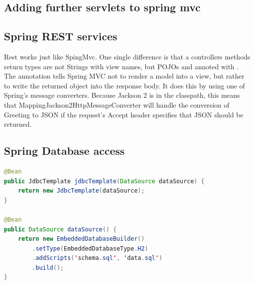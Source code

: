 \subsection{Adding further servlets to spring mvc}




\subsection{Spring REST services}
Rest works just like SpingMvc. One single difference is that a controllers methods return types are not Strings with view names, but POJOs and annoted with . The  annotation tells Spring MVC not to render a model into a view, but rather to write the returned object into the response body. It does this by using one of Spring’s message converters. Because Jackson 2 is in the classpath, this means that MappingJackson2HttpMessageConverter will handle the conversion of Greeting to JSON if the request’s Accept header specifies that JSON should be returned.

\subsection{Spring Database access}

\begin{lstlisting}[language=java]
@Bean
public JdbcTemplate jdbcTemplate(DataSource dataSource) {
    return new JdbcTemplate(dataSource);
}

@Bean
public DataSource dataSource() {
    return new EmbeddedDatabaseBuilder()
        .setType(EmbeddedDatabaseType.H2)
        .addScripts('schema.sql', 'data.sql')
        .build();
}
\end{lstlisting}